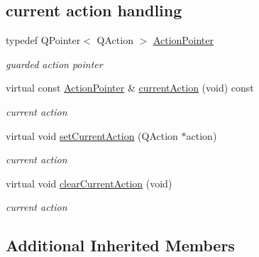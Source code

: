 \subsection*{current action handling}
\begin{DoxyCompactItemize}
\item 
\mbox{\label{class_menu_bar_data_v1_ad3f00a8eb98d3674a06761fea74769be}} 
typedef Q\+Pointer$<$ Q\+Action $>$ \hyperlink{class_menu_bar_data_v1_ad3f00a8eb98d3674a06761fea74769be}{Action\+Pointer}
\begin{DoxyCompactList}\small\item\em guarded action pointer \end{DoxyCompactList}\item 
\mbox{\label{class_menu_bar_data_v1_a1c380b024711abab26a039715d76346c}} 
virtual const \hyperlink{class_menu_bar_data_v1_ad3f00a8eb98d3674a06761fea74769be}{Action\+Pointer} \& \hyperlink{class_menu_bar_data_v1_a1c380b024711abab26a039715d76346c}{current\+Action} (void) const
\begin{DoxyCompactList}\small\item\em current action \end{DoxyCompactList}\item 
\mbox{\label{class_menu_bar_data_v1_a98847f06e65d11775a95cc5af3de29fa}} 
virtual void \hyperlink{class_menu_bar_data_v1_a98847f06e65d11775a95cc5af3de29fa}{set\+Current\+Action} (Q\+Action $\ast$action)
\begin{DoxyCompactList}\small\item\em current action \end{DoxyCompactList}\item 
\mbox{\label{class_menu_bar_data_v1_a73f57d897832d4b32f965dec336b4f61}} 
virtual void \hyperlink{class_menu_bar_data_v1_a73f57d897832d4b32f965dec336b4f61}{clear\+Current\+Action} (void)
\begin{DoxyCompactList}\small\item\em current action \end{DoxyCompactList}\end{DoxyCompactItemize}
\subsection*{Additional Inherited Members}


